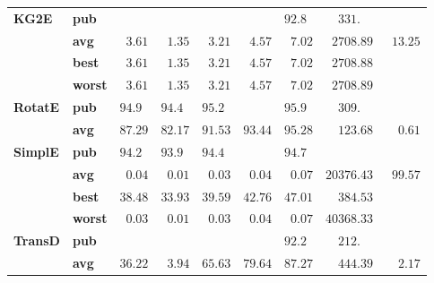 \begin{tabular}{llrrrrrrr}
\textbf{KG2E} & \textbf{pub} &                    &                    &                    &                    &  $92.8\phantom{0}$ &  $\phantom{00}331.\phantom{00}$ &                     \\
       & \textbf{avg} &  $\phantom{0}3.61$ &  $\phantom{0}1.35$ &  $\phantom{0}3.21$ &  $\phantom{0}4.57$ &  $\phantom{0}7.02$ &            $\phantom{0}2708.89$ &  $\phantom{0}13.25$ \\
       & \textbf{best} &  $\phantom{0}3.61$ &  $\phantom{0}1.35$ &  $\phantom{0}3.21$ &  $\phantom{0}4.57$ &  $\phantom{0}7.02$ &            $\phantom{0}2708.88$ &                     \\
       & \textbf{worst} &  $\phantom{0}3.61$ &  $\phantom{0}1.35$ &  $\phantom{0}3.21$ &  $\phantom{0}4.57$ &  $\phantom{0}7.02$ &            $\phantom{0}2708.89$ &                     \\
\textbf{RotatE} & \textbf{pub} &  $94.9\phantom{0}$ &  $94.4\phantom{0}$ &  $95.2\phantom{0}$ &                    &  $95.9\phantom{0}$ &  $\phantom{00}309.\phantom{00}$ &                     \\
       & \textbf{avg} &            $87.29$ &            $82.17$ &            $91.53$ &            $93.44$ &            $95.28$ &            $\phantom{00}123.68$ &  $\phantom{00}0.61$ \\
\textbf{SimplE} & \textbf{pub} &  $94.2\phantom{0}$ &  $93.9\phantom{0}$ &  $94.4\phantom{0}$ &                    &  $94.7\phantom{0}$ &                                 &                     \\
       & \textbf{avg} &  $\phantom{0}0.04$ &  $\phantom{0}0.01$ &  $\phantom{0}0.03$ &  $\phantom{0}0.04$ &  $\phantom{0}0.07$ &                      $20376.43$ &  $\phantom{0}99.57$ \\
       & \textbf{best} &            $38.48$ &            $33.93$ &            $39.59$ &            $42.76$ &            $47.01$ &            $\phantom{00}384.53$ &                     \\
       & \textbf{worst} &  $\phantom{0}0.03$ &  $\phantom{0}0.01$ &  $\phantom{0}0.03$ &  $\phantom{0}0.04$ &  $\phantom{0}0.07$ &                      $40368.33$ &                     \\
\textbf{TransD} & \textbf{pub} &                    &                    &                    &                    &  $92.2\phantom{0}$ &  $\phantom{00}212.\phantom{00}$ &                     \\
       & \textbf{avg} &            $36.22$ &  $\phantom{0}3.94$ &            $65.63$ &            $79.64$ &            $87.27$ &            $\phantom{00}444.39$ &  $\phantom{00}2.17$ \\

\end{tabular}

